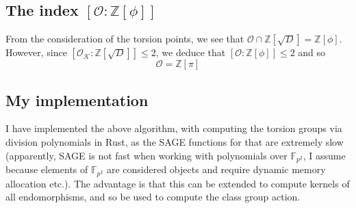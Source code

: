\documentclass{scrartcl}
\newcommand{\Z}{\mathbb{Z}}
\newcommand{\F}{\mathbb{F}}
\newcommand{\K}{\mathcal{K}}
\renewcommand{\O}{\mathcal{O}}
\theoremstyle{definition}
\begin{document}
\subsection*{The index $[\O : \Z[\phi]]$}
From the consideration of the torsion points, we see that $\O \cap \Z[\sqrt{D}] = \Z[\phi]$.
However, since $[\O_\K : \Z[\sqrt{D}]] \leq 2$, we deduce that $[\O : \Z[\phi]] \leq 2$ and so
\begin{equation*}
    \O = \Z[\pi]
\end{equation*}

\subsection*{My implementation}
I have implemented the above algorithm, with computing the torsion groups via division polynomials in Rust, as the SAGE functions for that are extremely slow (apparently, SAGE is not fast when working with polynomials over $\F_{p^2}$, I assume because elements of $\F_{p^2}$ are considered objects and require dynamic memory allocation etc.).
The advantage is that this can be extended to compute kernels of all endomorphisms, and so be used to compute the class group action.
\end{document}
